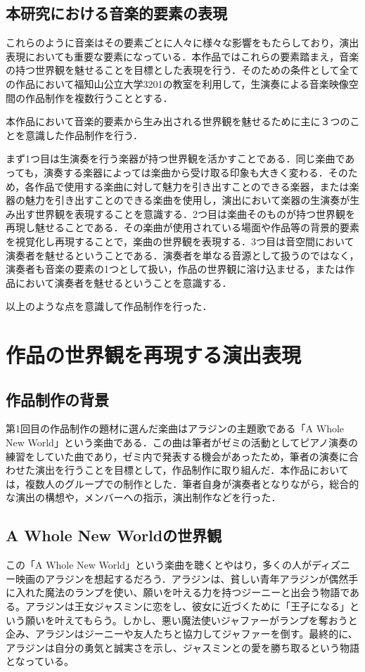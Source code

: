 \subsection{本研究における音楽的要素の表現}
これらのように音楽はその要素ごとに人々に様々な影響をもたらしており，演出表現においても重要な要素になっている．本作品ではこれらの要素踏まえ，音楽の持つ世界観を魅せることを目標とした表現を行う．そのための条件として全ての作品において福知山公立大学3201の教室を利用して，生演奏による音楽映像空間の作品制作を複数行うこととする．

本作品において音楽的要素から生み出される世界観を魅せるために主に３つのことを意識した作品制作を行う．

まず1つ目は生演奏を行う楽器が持つ世界観を活かすことである．同じ楽曲であっても，演奏する楽器によっては楽曲から受け取る印象も大きく変わる．そのため，各作品で使用する楽曲に対して魅力を引き出すことのできる楽器，または楽器の魅力を引き出すことのできる楽曲を使用し，演出において楽器の生演奏が生み出す世界観を表現することを意識する．2つ目は楽曲そのものが持つ世界観を再現し魅せることである．その楽曲が使用されている場面や作品等の背景的要素を視覚化し再現することで，楽曲の世界観を表現する．3つ目は音空間において演奏者を魅せるということである．演奏者を単なる音源として扱うのではなく，演奏者も音楽の要素の1つとして扱い，作品の世界観に溶け込ませる，または作品において演奏者を魅せるということを意識する．

以上のような点を意識して作品制作を行った．




\section{作品の世界観を再現する演出表現}\label{sec:aladdin_factor}
\subsection{作品制作の背景}
第1回目の作品制作の題材に選んだ楽曲はアラジンの主題歌である「A Whole New World」\cite{Aladdin}という楽曲である．この曲は筆者がゼミの活動としてピアノ演奏の練習をしていた曲であり，ゼミ内で発表する機会があったため，筆者の演奏に合わせた演出を行うことを目標として，作品制作に取り組んだ．本作品においては，複数人のグループでの制作とした．筆者自身が演奏者となりながら，総合的な演出の構想や，メンバーへの指示，演出制作などを行った．


\subsection{A Whole New Worldの世界観}
この「A Whole New World」という楽曲を聴くとやはり，多くの人がディズニー映画のアラジンを想起するだろう．アラジンは、貧しい青年アラジンが偶然手に入れた魔法のランプを使い、願いを叶える力を持つジーニーと出会う物語である。アラジンは王女ジャスミンに恋をし、彼女に近づくために「王子になる」という願いを叶えてもらう。しかし、悪い魔法使いジャファーがランプを奪おうと企み、アラジンはジーニーや友人たちと協力してジャファーを倒す。最終的に、アラジンは自分の勇気と誠実さを示し、ジャスミンとの愛を勝ち取るという物語となっている。

